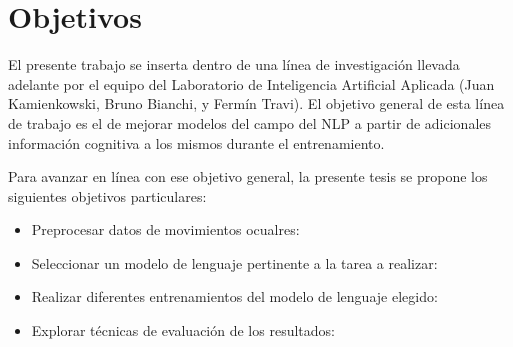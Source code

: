 \chapter{Objetivos}

El presente trabajo se inserta dentro de una línea de investigación llevada adelante por el equipo del Laboratorio de Inteligencia Artificial Aplicada (Juan Kamienkowski, Bruno Bianchi, y Fermín Travi). El objetivo general de esta línea de trabajo es el de mejorar modelos del campo del NLP a partir de adicionales información cognitiva a los mismos durante el entrenamiento.

Para avanzar en línea con ese objetivo general, la presente tesis se propone los siguientes objetivos particulares:
\begin{itemize}
    \item Preprocesar datos de movimientos ocualres: 
    \item Seleccionar un modelo de lenguaje pertinente a la tarea a realizar: 
    \item Realizar diferentes entrenamientos del modelo de lenguaje elegido: 
    \item Explorar técnicas de evaluación de los resultados: 
\end{itemize}




